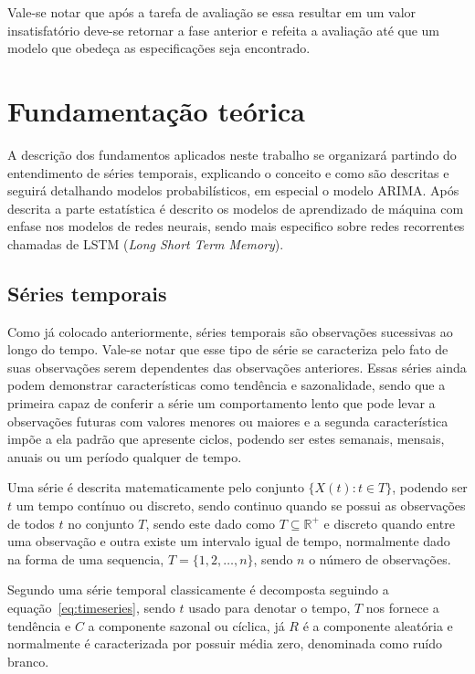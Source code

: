 \documentclass[
	12pt,
	oneside,
	a4paper,
	english,
	brazil
]{abntex2}
\begin{document}
Vale-se notar que após a tarefa de avaliação se essa resultar em um valor 
insatisfatório deve-se retornar a fase anterior e refeita a avaliação até que um 
modelo que obedeça as especificações seja encontrado.

\chapter{Fundamentação teórica}
A descrição dos fundamentos aplicados neste trabalho se organizará partindo do 
entendimento de séries temporais, explicando o conceito e como são descritas e 
seguirá detalhando modelos probabilísticos, em especial o modelo ARIMA\@. Após 
descrita a parte estatística é descrito os modelos de aprendizado de máquina com 
enfase nos modelos de redes neurais, sendo mais especifico sobre redes 
recorrentes chamadas de LSTM (\textit{Long Short Term Memory}).

\section{Séries temporais}

Como já colocado anteriormente, séries temporais são observações sucessivas ao 
longo do tempo. Vale-se notar que esse tipo de série se caracteriza pelo fato de 
suas observações serem dependentes das observações anteriores. Essas séries 
ainda podem demonstrar características como tendência e sazonalidade, sendo que 
a primeira capaz de conferir a série um comportamento lento que pode levar a 
observações futuras com valores menores ou maiores e a segunda característica 
impõe a ela padrão que apresente ciclos, podendo ser estes semanais, mensais, 
anuais ou um período qualquer de tempo.

Uma série é descrita matematicamente pelo conjunto $\{X(t): t \in T\}$, podendo 
ser $t$ um tempo contínuo ou discreto, sendo continuo quando se possui as 
observações de todos $t$ no conjunto $T$, sendo este dado como $T \subseteq 
\mathbb{R}^{+}$ e discreto quando entre uma observação e outra existe um 
intervalo igual de tempo, normalmente dado na forma de uma sequencia, $T = \{1, 
2, \ldots, n\}$, sendo $n$ o número de observações.

Segundo  uma série temporal classicamente é decomposta 
seguindo a equação~\ref{eq:timeseries}, sendo $t$ usado para denotar o tempo, 
$T$ nos fornece a tendência e $C$ a componente sazonal ou cíclica, já $R$ é a 
componente aleatória e normalmente é caracterizada por possuir média zero, 
denominada como ruído branco.
\end{document}
